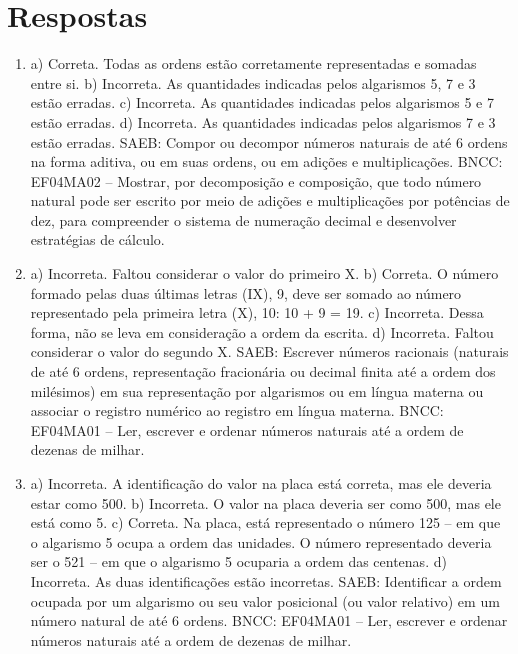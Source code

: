 \chapter{Respostas}
\pagestyle{plain}
\footnotesize

\pagecolor{gray!40}


\begin{enumerate}
\item
a) Correta. Todas as ordens estão corretamente representadas e somadas entre si.
b) Incorreta. As quantidades indicadas pelos algarismos 5, 7 e 3 estão erradas.
c) Incorreta. As quantidades indicadas pelos algarismos 5 e 7 estão erradas.
d) Incorreta. As quantidades indicadas pelos algarismos 7 e 3 estão erradas.
SAEB: Compor ou decompor números naturais de até 6 ordens na forma aditiva, ou em suas ordens, ou em adições e multiplicações.
BNCC: EF04MA02 -- Mostrar, por decomposição e composição, que todo número natural pode ser escrito
por meio de adições e multiplicações por potências de dez, para compreender o sistema de
numeração decimal e desenvolver estratégias de cálculo.

\item
a)  Incorreta. Faltou considerar o valor do primeiro X.
b)  Correta. O número formado pelas duas últimas letras (IX), 9, deve ser somado ao número representado pela primeira letra (X), 10: 10 + 9 = 19.
c)  Incorreta. Dessa forma, não se leva em consideração a ordem da escrita.
d)  Incorreta. Faltou considerar o valor do segundo X.
SAEB: Escrever números racionais (naturais de até 6 ordens, representação fracionária ou decimal finita até a ordem dos milésimos) em sua representação por algarismos ou em língua materna ou associar o registro numérico ao registro em língua materna.
BNCC: EF04MA01 -- Ler, escrever e ordenar números naturais até a ordem de dezenas de milhar.

\item
a)  Incorreta. A identificação do valor na placa está correta, mas ele deveria estar como 500.
b)  Incorreta. O valor na placa deveria ser como 500, mas ele está como 5.
c)  Correta. Na placa, está representado o número 125 -- em que o algarismo 5 ocupa a ordem das unidades. O número representado deveria ser o 521 -- em que o algarismo 5 ocuparia a ordem das centenas.
d)  Incorreta. As duas identificações estão incorretas.
SAEB: Identificar a ordem ocupada por um algarismo ou seu valor posicional (ou valor relativo) em um número natural de até 6 ordens.
BNCC: EF04MA01 -- Ler, escrever e ordenar números naturais até a ordem de dezenas de milhar.
\end{enumerate}

